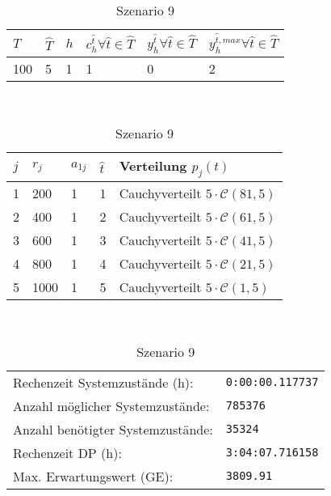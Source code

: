 \begin{table}[h!]
\renewcommand{\arraystretch}{1.5}
  \begin{center}
    \caption{Szenario 9}  \label{S9}
    \vspace*{3mm}
    \begin{tabular}{l l l l l l}   %
    $T$ & $\hat T$  & $h$ & $c_h^{\hat t}\forall \hat{t}\in{\hat T}$ & $y_h^{\hat t}\forall \hat{t}\in{\hat T}$  & $y_h^{{\hat t},max}\forall \hat{t}\in{\hat T}$  \\  \hline
100 & 5 & 1 & 1 & 0 & 2  \\ \hline
    \end{tabular} \\[3mm]
        \begin{tabular}{p{1cm} p{1cm} p{1cm}  p{1cm} p{6cm}}   %
    $j$ & $r_j$  & $a_{1j}$ & $\hat t$ & Verteilung $p_j(t)$ \\  \hline
1 & 200 & 1 & 1 & Cauchyverteilt $5\cdot\mathcal{C}(81, 5)$   \\
2 & 400 & 1 & 2 & Cauchyverteilt $5\cdot\mathcal{C}(61, 5)$  \\
3 & 600 & 1 & 3 & Cauchyverteilt $5\cdot\mathcal{C}(41, 5)$  \\
4 & 800 & 1 & 4 & Cauchyverteilt $5\cdot\mathcal{C}(21, 5)$  \\
5 & 1000 & 1 & 5 & Cauchyverteilt $5\cdot\mathcal{C}(1, 5)$ \\ \hline
    \end{tabular} \\[3mm]
     \begin{tabular}{p{7cm}p{5cm}} \hline
     Rechenzeit Systemzustände (h): & \texttt{0:00:00.117737} \\
     Anzahl möglicher Systemzustände: & \texttt{785376} \\
     Anzahl benötigter Systemzustände: & \texttt{35324} \\ 
     Rechenzeit DP (h): & \texttt{3:04:07.716158} \\ 
          Max. Erwartungswert (GE): & \texttt{3809.91} \\ \hline
         \end{tabular} \\[3mm]
  \end{center}
\end{table}

